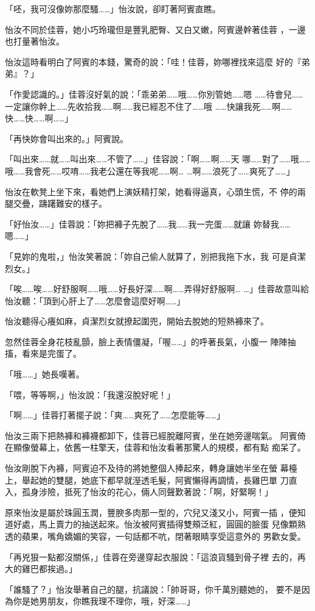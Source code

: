 「呸，我可沒像妳那麼騷……」怡汝說，卻盯著阿賓直瞧。

怡汝不同於佳蓉，她小巧玲瓏但是豐乳肥臀、又白又嫩，阿賓邊幹著佳蓉
，一邊也打量著怡汝。

怡汝這時看明白了阿賓的本錢，驚奇的說：「哇！佳蓉，妳哪裡找來這麼
好的『弟弟』？」

「作愛認識的。」佳蓉沒好氣的說：「乖弟弟……哦……你別管她……嗯
……待會兒……一定讓你幹上……先收拾我……啊……我已經忍不住了……哦
……快讓我死……啊……快……快……啊……」

「再快妳會叫出來的。」阿賓說。

「叫出來……就……叫出來……不管了……」佳容說：「啊……啊……天
哪……對了……哦……哦……我會死……哎唷……我老公還在等我呢……啊…
…啊……浪死了……爽死了……」

怡汝在軟凳上坐下來，看她們上演妖精打架，她看得逼真，心頭生慌，不
停的兩腿交疊，躊躇難安的樣子。

「好怡汝……」佳蓉說：「妳把褲子先脫了……我……我一完蛋……就讓
妳替我……嗯……」

「見妳的鬼啦，」怡汝笑著說：「妳自己偷人就算了，別把我拖下水，我
可是貞潔烈女。」

「唉……唉……好舒服啊……哦……好長好深……啊……弄得好舒服啊…
…」佳蓉故意叫給怡汝聽：「頂到心肝上了……怎麼會這麼好啊……」

怡汝聽得心癢如麻，貞潔烈女就撩起圍兜，開始去脫她的短熱褲來了。

忽然佳蓉全身花枝亂顫，臉上表情僵凝，「喔……」的呼著長氣，小腹一
陣陣抽搐，看來是完蛋了。

「哦……」她長嘆著。

「喂，等等啊，」怡汝說：「我還沒脫好呢！」

「啊……」佳蓉打著擺子說：「爽……爽死了……怎麼能等……」

怡汝三兩下把熱褲和褲襪都卸下，佳蓉已經脫離阿賓，坐在她旁邊喘氣。
阿賓倚在顯像螢幕上，依舊一柱擎天，佳蓉和怡汝看著那驚人的規模，都有點
痴呆了。

怡汝剛脫下內褲，阿賓迫不及待的將她整個人捧起來，轉身讓她半坐在螢
幕檯上，舉起她的雙腿，她底下都早就溼透毛髮，阿賓懶得再調情，長雞巴單
刀直入，孤身涉險，抵死了怡汝的花心，倆人同聲歎著說：「啊，好緊啊！」

原來怡汝是屬於珠圓玉潤，豐腴多肉那一型的，穴兒又淺又小，阿賓一插
，便知道好處，馬上賣力的抽送起來。怡汝被阿賓插得雙頰泛紅，圓圓的臉蛋
兒像顆熟透的蘋果，嘴角嬌媚的笑容，一句話都不吭，閉著眼睛享受這意外的
男歡女愛。

「再兇狠一點都沒關係，」佳蓉在旁邊穿起衣服說：「這浪貨騷到骨子裡
去的，再大的雞巴都挨過。」

「誰騷了？」怡汝舉著自己的腿，抗議說：「帥哥哥，你千萬別聽她的，
要不是因為你是她男朋友，你瞧我理不理你，哦，好深……」


